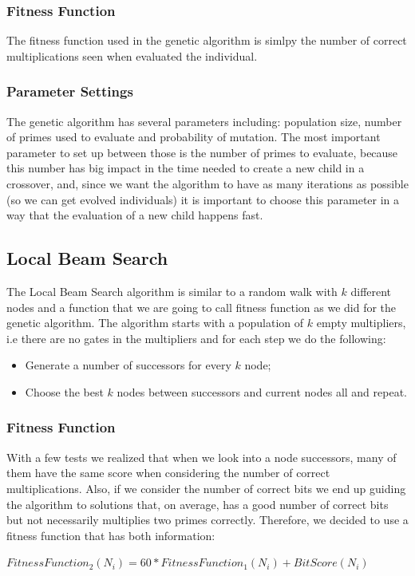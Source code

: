 \documentclass[12pt]{article}
\begin{document}
\subsubsection{Fitness Function}
The fitness function used in the genetic algorithm is simlpy the number of correct multiplications seen when evaluated the individual.

\subsubsection{Parameter Settings}
The genetic algorithm has several parameters including: population size, number of primes used to evaluate and probability of mutation. The most important parameter to set up between those is the number of primes to evaluate, because this number has big impact in the time needed to create a new child in a crossover, and, since we want the algorithm to have as many iterations as possible (so we can get evolved individuals) it is important to choose this parameter in a way that the evaluation of a new child happens fast.


\subsection{Local Beam Search}
The Local Beam Search algorithm is similar to a random walk with $k$ different nodes and a function that we are going to call fitness function as we did for the genetic algorithm. The algorithm starts with a population of $k$ empty multipliers, i.e there are no gates in the multipliers and for each step we do the following:
\begin{itemize}
\item{Generate a number of successors for every $k$ node;}
\item{Choose the best $k$ nodes between successors and current nodes all and repeat.}
\end{itemize}
\subsubsection{Fitness Function}
With a few tests we realized that when we look into a node successors, many of them have the same score when considering the number of correct multiplications. Also, if we consider the number of correct bits we end up guiding the algorithm to solutions that, on average, has a good number of correct bits but not necessarily multiplies two primes correctly. Therefore, we decided to use a fitness function that has both information:
\begin{center}
    $FitnessFunction_2 (N_i) = 60 * FitnessFunction_1 (N_i) + BitScore (N_i)$
\end{center}
\end{document}

